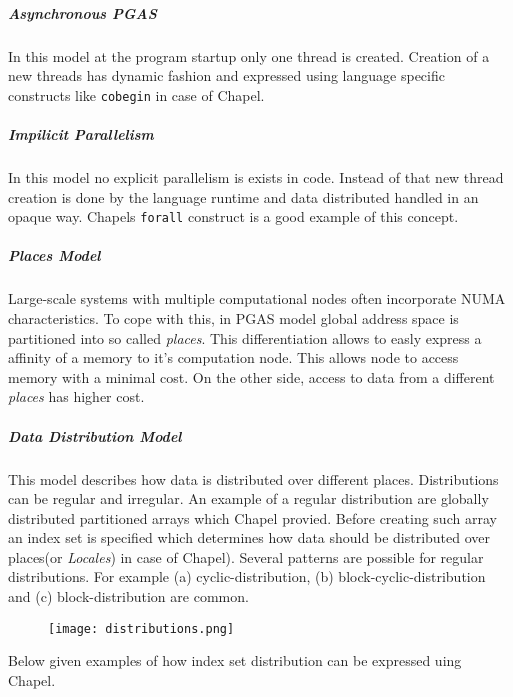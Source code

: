 \documentclass[14pt]{extreport}
\begin{document}
\subparagraph{Asynchronous PGAS}
In this model at the program startup only one thread is created. Creation of a new threads has dynamic fashion and expressed using language specific constructs like \texttt{cobegin} in case of Chapel.

\subparagraph{Impilicit Parallelism} In this model no explicit parallelism is exists in code. Instead of that new thread creation is done by the language runtime and data distributed handled in an opaque way. Chapels \texttt{forall} construct is a good example of this concept. 

\subparagraph{Places Model}
Large-scale systems with multiple computational nodes often incorporate NUMA characteristics. To cope with this, in PGAS model global address space is partitioned into so called \textit{places}. This differentiation allows to easly express a affinity of a memory to it's computation node. This allows node to access memory with a minimal cost. On the other side, access to data from a different \textit{places} has higher cost.

\subparagraph{Data Distribution Model}\label{DataDistributionModelSubParagraph}
This model describes how data is distributed over different places. Distributions can be regular and irregular. An example of a regular distribution are globally distributed partitioned arrays which Chapel provied. Before creating such array an index set is specified which determines how data should be distributed over places(or \textit{Locales}) in case of Chapel). Several patterns are possible for regular distributions. For example (a) cyclic-distribution, (b) block-cyclic-distribution and (c) block-distribution are common.

\begin{figure}[H]
	\centering
\texttt{[image: distributions.png]}
\end{figure}


Below given examples of how index set distribution can be expressed uing Chapel. 
\end{document}
